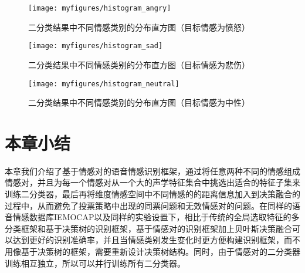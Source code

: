 \begin{figure}[htb] %
    \centering
    \texttt{[image: myfigures/histogram\_angry]}
    \caption{二分类结果中不同情感类别的分布直方图（目标情感为愤怒）}
    \label{fig:histogram_angry}
\end{figure}

\begin{figure}[htb] %
    \centering
    \texttt{[image: myfigures/histogram\_sad]}
    \caption{二分类结果中不同情感类别的分布直方图（目标情感为悲伤）}
    \label{fig:histogram_sad}
\end{figure}

\begin{figure}[htb] %
    \centering
    \texttt{[image: myfigures/histogram\_neutral]}
    \caption{二分类结果中不同情感类别的分布直方图（目标情感为中性）}
    \label{fig:histogram_neutral}
\end{figure}

\section{本章小结}
\label{sec:emo_pair_summary}

本章我们介绍了基于情感对的语音情感识别框架，通过将任意两种不同的情感组成情感对，并且为每一个情感对从一个大的声学特征集合中挑选出适合的特征子集来训练二分类器，最后再将维度情感空间中不同情感的的距离信息加入到决策融合的过程中，从而避免了投票策略中出现的同票问题和无效情感对的问题。在同样的语音情感数据库IEMOCAP以及同样的实验设置下，相比于传统的全局选取特征的多分类框架和基于决策树的识别框架，基于情感对的识别框架加上贝叶斯决策融合可以达到更好的识别准确率，并且当情感类别发生变化时更方便构建识别框架，而不用像基于决策树的框架，需要重新设计决策树结构。同时，由于情感对的二分类器训练相互独立，所以可以并行训练所有二分类器。
